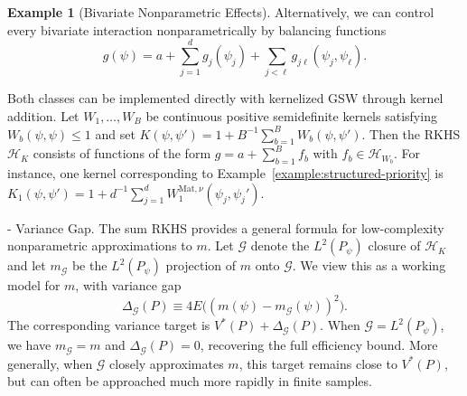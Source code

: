 \documentclass[letterpaper,12pt]{article}
\makeatletter
\theoremstyle{definition}
\newtheorem{ex}[thm]{Example}
\numberwithin{equation}{section}
\newcommand{\mc}{\mathcal}
\renewcommand{\paragraph}{\@startsection{paragraph}{4}{\z@}%
  {\medskipamount}%
  {-\fontdimen2\font}%
  {\normalfont\normalsize\bfseries}}
\makeatother
\begin{document}
\begin{ex}[Bivariate Nonparametric Effects]\label{example:structured-bivariate}
Alternatively, we can control every bivariate interaction nonparametrically by balancing functions
\begin{equation}\label{equation:bivariate-nonparametric-class}
g(\psi)=a+\sum_{j=1}^dg_j(\psi_j)+\sum_{j<\ell}g_{j\ell}(\psi_j,\psi_\ell).
\end{equation}
\end{ex}

Both classes can be implemented directly with kernelized GSW through kernel addition.
Let $W_1,\ldots,W_B$ be continuous positive semidefinite kernels satisfying $W_b(\psi,\psi)\leq1$ and set $K(\psi,\psi')=1+B^{-1}\sum_{b=1}^BW_b(\psi,\psi')$.
Then the RKHS $\mc H_K$ consists of functions of the form $g=a+\sum_{b=1}^Bf_b$ with $f_b\in\mc H_{W_b}$.
For instance, one kernel corresponding to Example~\ref{example:structured-priority} is $K_1(\psi,\psi')=1+d^{-1}\sum_{j=1}^dW_1^{\mathrm{Mat},\nu}(\psi_j,\psi_j')$.


\paragraph{Variance Gap.}
The sum RKHS provides a general formula for low-complexity nonparametric approximations to $m$.
Let $\mc G$ denote the $L^2(P_\psi)$ closure of $\mc H_K$ and let $m_{\mc G}$ be the $L^2(P_\psi)$ projection of $m$ onto $\mc G$. We view this as a working model for $m$, with variance gap 
\begin{equation}\label{equation:working-model-approximation-gap}
\Delta_{\mc G}(P)\equiv4E\bigl((m(\psi)-m_{\mc G}(\psi))^2\bigr).
\end{equation}
The corresponding variance target is $V^*(P)+\Delta_{\mc G}(P)$.
When $\mc G=L^2(P_\psi)$, we have $m_{\mc G}=m$ and $\Delta_{\mc G}(P)=0$, recovering the full efficiency bound.
More generally, when $\mc G$ closely approximates $m$, this target remains close to $V^*(P)$, but can often be approached much more rapidly in finite samples.
\end{document}
